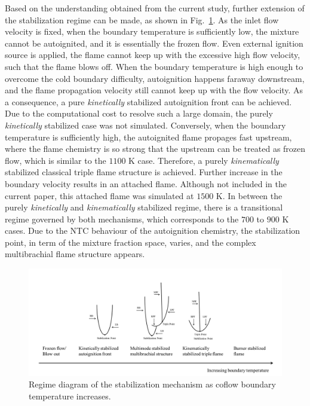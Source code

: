 \documentclass[review,3p,times]{elsarticleUS}
\begin{document}
Based on the understanding obtained from the current study, further extension of the stabilization regime can be made, as shown in Fig.~\ref{fig:regime}.  As the inlet flow velocity is fixed, when the boundary temperature is sufficiently low, the mixture cannot be autoignited, and it is essentially the frozen flow.  Even external ignition source is applied, the flame cannot keep up with the excessive high flow velocity, such that the flame blows off.  When the boundary temperature is high enough to overcome the cold boundary difficulty, autoignition happens faraway downstream, and the flame propagation velocity still cannot keep up with the flow velocity.  As a consequence, a pure \emph {kinetically} stabilized autoignition front can be achieved.  Due to the computational cost to resolve such a large domain, the purely \emph {kinetically} stabilized case was not simulated.  Conversely, when the boundary temperature is sufficiently high, the autoignited flame propages fast upstream, where the flame chemistry is so strong that the upstream can be treated as frozen flow, which is similar to the $1100$ K case.  Therefore, a purely \emph {kinematically} stabilized classical triple flame structure is achieved.  Further increase in the boundary velocity results in an attached flame.  Although not included in the current paper, this attached flame was simulated at $1500$ K.  In between the purely \emph {kinetically} and \emph {kinematically} stabilized regime, there is a transitional regime governed by both mechanisms, which corresponds to the $700$ to $900$ K cases.  Due to the NTC behaviour of the autoignition chemistry, the stabilization point, in term of the mixture fraction space, varies, and the complex multibrachial flame structure appears.  

\begin{figure}[t]
  \centering
  \scriptsize
  \includegraphics[width=1.0\textwidth]{regime.png}
  \normalsize
  \caption{Regime diagram of the stabilization mechanism as coflow boundary temperature increases.}
  \label{fig:regime}
\end{figure}
\end{document}
